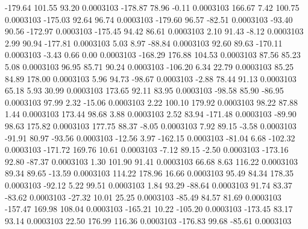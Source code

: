      -179.64      101.55       93.20     0.0003103
     -178.87       78.96       -0.11     0.0003103
      166.67        7.42      100.75     0.0003103
     -175.03       92.64       96.74     0.0003103
     -179.60       96.57      -82.51     0.0003103
      -93.40       90.56     -172.97     0.0003103
     -175.45       94.42       86.61     0.0003103
        2.10       91.43       -8.12     0.0003103
        2.99       90.94     -177.81     0.0003103
        5.03        8.97      -88.84     0.0003103
       92.60       89.63     -170.11     0.0003103
       -3.43        0.66        0.00     0.0003103
     -168.29      176.88      104.53     0.0003103
       87.56       85.23        5.08     0.0003103
       96.95       85.71       90.24     0.0003103
     -106.20        6.34       22.79     0.0003103
       85.25       84.89      178.00     0.0003103
        5.96       94.73      -98.67     0.0003103
       -2.88       78.44       91.13     0.0003103
       65.18        5.93       30.99     0.0003103
      173.65       92.11       83.95     0.0003103
      -98.58       85.90      -86.95     0.0003103
       97.99        2.32      -15.06     0.0003103
        2.22      100.10      179.92     0.0003103
       98.22       87.88        1.44     0.0003103
      173.44       98.68        3.88     0.0003103
        2.52       83.94     -171.48     0.0003103
      -89.90       98.63      175.82     0.0003103
      177.75       88.37       -8.05     0.0003103
        7.92       89.15       -3.58     0.0003103
      -91.91       80.97      -93.56     0.0003103
      -12.56        3.97     -162.15     0.0003103
      -81.04        6.68     -102.32     0.0003103
     -171.72      169.76       10.61     0.0003103
       -7.12       89.15       -2.50     0.0003103
     -173.16       92.80      -87.37     0.0003103
        1.30      101.90       91.41     0.0003103
       66.68        8.63      116.22     0.0003103
       89.34       89.65      -13.59     0.0003103
      114.22      178.96       16.66     0.0003103
       95.49       84.34      178.35     0.0003103
      -92.12        5.22       99.51     0.0003103
        1.84       93.29      -88.64     0.0003103
       91.74       83.37      -83.62     0.0003103
      -27.32       10.01       25.25     0.0003103
      -85.49       84.57       81.69     0.0003103
     -157.47      169.98      108.04     0.0003103
     -165.21       10.22     -105.20     0.0003103
     -173.45       83.17       93.14     0.0003103
       22.50      176.99      116.36     0.0003103
     -176.83       99.68      -85.61     0.0003103
